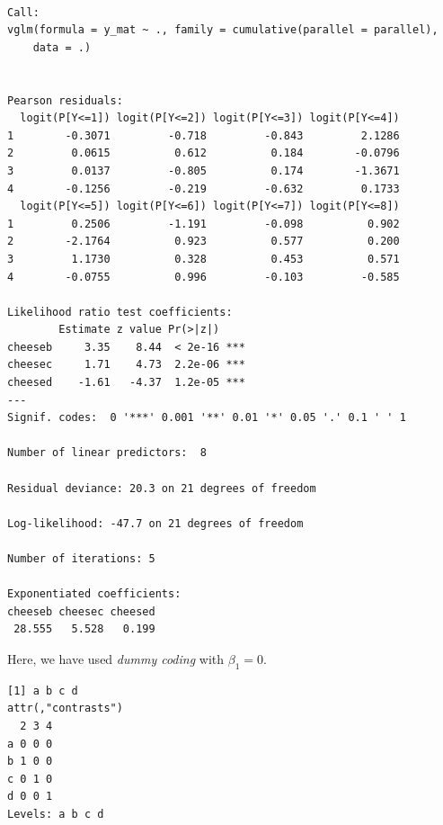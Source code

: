 \documentclass[]{book}
\newenvironment{Shaded}{\begin{snugshade}}{\end{snugshade}}
\newcommand{\DataTypeTok}[1]{\textcolor[rgb]{0.13,0.29,0.53}{#1}}
\newcommand{\KeywordTok}[1]{\textcolor[rgb]{0.13,0.29,0.53}{\textbf{#1}}}
\newcommand{\NormalTok}[1]{#1}
\newcommand{\OperatorTok}[1]{\textcolor[rgb]{0.81,0.36,0.00}{\textbf{#1}}}
\newcommand{\OtherTok}[1]{\textcolor[rgb]{0.56,0.35,0.01}{#1}}
\newcommand{\StringTok}[1]{\textcolor[rgb]{0.31,0.60,0.02}{#1}}
\begin{document}
\begin{Shaded}
\end{Shaded}

\begin{verbatim}

Call:
vglm(formula = y_mat ~ ., family = cumulative(parallel = parallel), 
    data = .)


Pearson residuals:
  logit(P[Y<=1]) logit(P[Y<=2]) logit(P[Y<=3]) logit(P[Y<=4])
1        -0.3071         -0.718         -0.843         2.1286
2         0.0615          0.612          0.184        -0.0796
3         0.0137         -0.805          0.174        -1.3671
4        -0.1256         -0.219         -0.632         0.1733
  logit(P[Y<=5]) logit(P[Y<=6]) logit(P[Y<=7]) logit(P[Y<=8])
1         0.2506         -1.191         -0.098          0.902
2        -2.1764          0.923          0.577          0.200
3         1.1730          0.328          0.453          0.571
4        -0.0755          0.996         -0.103         -0.585

Likelihood ratio test coefficients: 
        Estimate z value Pr(>|z|)    
cheeseb     3.35    8.44  < 2e-16 ***
cheesec     1.71    4.73  2.2e-06 ***
cheesed    -1.61   -4.37  1.2e-05 ***
---
Signif. codes:  0 '***' 0.001 '**' 0.01 '*' 0.05 '.' 0.1 ' ' 1

Number of linear predictors:  8 

Residual deviance: 20.3 on 21 degrees of freedom

Log-likelihood: -47.7 on 21 degrees of freedom

Number of iterations: 5 

Exponentiated coefficients:
cheeseb cheesec cheesed 
 28.555   5.528   0.199 
\end{verbatim}

Here, we have used \emph{dummy coding} with \(\beta_1 = 0\).

\begin{verbatim}
[1] a b c d
attr(,"contrasts")
  2 3 4
a 0 0 0
b 1 0 0
c 0 1 0
d 0 0 1
Levels: a b c d
\end{verbatim}
\end{document}
